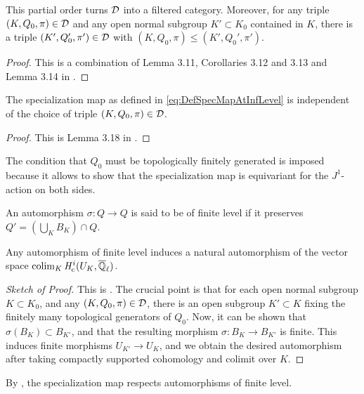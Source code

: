 \documentclass[../main.tex]{subfiles}
\begin{document}
\begin{lem}\label{lem:MiedaCategoryOfChoicesIsFiltered}
  This partial order turns $\mathcal{D}$ into a filtered category. Moreover, for any
  triple $(K, Q_0, \pi) \in \mathcal{D}$ and any open normal subgroup $K' \subset K_0$ 
  contained in $K$, there is a triple $(K', Q_0', \pi') \in \mathcal{D}$ with $(K, Q_0,
  \pi) \leq (K', Q_0', \pi')$. 
\begin{proof}
  This is a combination of Lemma 3.11, Corollaries 3.12 and 3.13 and 
  Lemma 3.14 in \cite{mieda2016geometric}.
\end{proof}
\end{lem}

\begin{prop}\label{lem:specmapisindependentofchoice}
  The specialization map as defined in \eqref{eq:DefSpecMapAtInfLevel} is
  independent of the choice of triple $(K, Q_0, \pi) \in \mathcal{D}$. 
  \begin{proof}
    This is Lemma 3.18 in \cite{mieda2016geometric}.
  \end{proof}
\end{prop}

The condition that $Q_0$ must be topologically finitely generated is imposed 
because it allows to show that the specialization map is equivariant for the 
$J^1$-action on both sides. 

\begin{defi}\label{def:MorphismOfFinLevel}
  An automorphism $\sigma\colon Q \to Q$ is said to be of finite level if it 
  preserves $Q' = (\bigcup_K B_K)\cap Q$. 
\end{defi}

\begin{lem}\label{lem:FinLevelAutoYIeldAutOfColim}
  Any automorphism of finite level
  induces a natural automorphism of the vector space $\operatorname*{colim}_K \mathit H_{\mathrm{c}}^i(U_K, {\overline {\mathbb{Q}}_\ell})$.
  \begin{proof}[Sketch of Proof] 
    This is \cite[Lemma 3.20]{mieda2016geometric}.  The crucial point 
    is that for each open normal subgroup $K \subset K_0$, and any $(K, Q_0, \pi) \in \mathcal{D}$, there is an open subgroup $K' \subset K$ fixing the 
    finitely many topological generators of $Q_0$. Now, it can be shown that 
    $\sigma(B_K) \subset B_{K'}$, and that the resulting morphism
    $\sigma\colon B_K \to B_{K'}$ is finite. This induces finite morphisms
    $U_{K'} \to U_K$, and we obtain the desired automorphism after taking compactly supported cohomology and colimit over $K$. 
\end{proof}
\end{lem}
By \cite[Proposition 3.21]{mieda2016geometric}, the specialization map respects
automorphisms of finite level.
\end{document}
